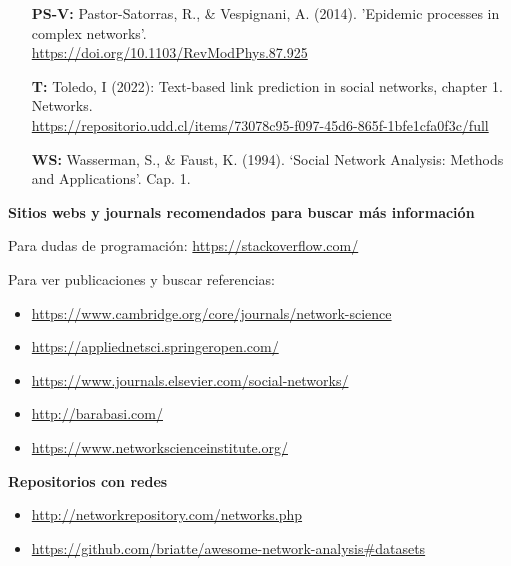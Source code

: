 \documentclass[12pt]{article}
\begin{document}
\begin{itemize}
    \item[\textbf{PS-V:}] Pastor-Satorras, R., \& Vespignani, A. (2014). 'Epidemic processes in complex networks'. \\
    \href{https://doi.org/10.1103/RevModPhys.87.925}{https://doi.org/10.1103/RevModPhys.87.925}
    \item[\textbf{T:}] Toledo, I (2022): Text-based link prediction in social networks, chapter 1. Networks.\\
    \href{https://repositorio.udd.cl/items/73078c95-f097-45d6-865f-1bfe1cfa0f3c/full}{https://repositorio.udd.cl/items/73078c95-f097-45d6-865f-1bfe1cfa0f3c/full}
    \item[\textbf{WS:}] Wasserman, S., \& Faust, K. (1994). ‘Social Network Analysis: Methods and Applications’. Cap. 1.
\end{itemize}

\textbf{Sitios webs y journals recomendados para buscar más información}

Para dudas de programación: \href{https://stackoverflow.com/}{https://stackoverflow.com/}

Para ver publicaciones y buscar referencias:
\begin{itemize}
    \item \href{https://www.cambridge.org/core/journals/network-science}{https://www.cambridge.org/core/journals/network-science}
    \item \href{https://appliednetsci.springeropen.com/}{https://appliednetsci.springeropen.com/}
    \item \href{https://www.journals.elsevier.com/social-networks/}{https://www.journals.elsevier.com/social-networks/}
    \item \href{http://barabasi.com/}{http://barabasi.com/}
    \item \href{https://www.networkscienceinstitute.org/}{https://www.networkscienceinstitute.org/}
\end{itemize}

\textbf{Repositorios con redes}
\begin{itemize}
    \item \href{http://networkrepository.com/networks.php}{http://networkrepository.com/networks.php}
    \item \href{https://github.com/briatte/awesome-network-analysis#datasets}{https://github.com/briatte/awesome-network-analysis\#datasets}
\end{itemize}
\end{document}

